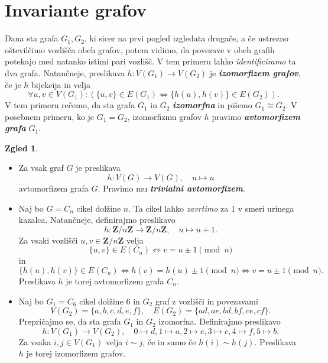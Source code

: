 \documentclass[11pt]{book}
\def\ZZ{\mathbf{Z}}
\def\definicija{\color{rdeca}\bf\em}
\theoremstyle{definition}
\theoremstyle{zgled}
\newtheorem*{zgled}{Zgled}
\theoremstyle{odprtproblem}
\theoremstyle{domacanaloga}
\theoremstyle{izrek}
\begin{document}
\section{Invariante grafov}

Dana sta grafa $G_1, G_2$, ki sicer na prvi pogled izgledata drugače, a če ustrezno oštevilčimo vozlišča obeh grafov, potem vidimo, da povezave v obeh grafih potekajo med natanko istimi pari vozlišč. V tem primeru lahko \emph{identificiramo} ta dva grafa. Natančneje, preslikava $h \colon V(G_1) \to V(G_2)$ je {\definicija izomorfizem grafov}, če je $h$ bijekcija in velja
\[
    \forall u,v \in V(G_1) \colon 
    \left( \{ u,v \} \in E(G_1) \Leftrightarrow \{ h(u), h(v) \} \in E(G_2) \right).
\]
V tem primeru rečemo, da sta grafa $G_1$ in $G_2$ {\definicija izomorfna} in pišemo $G_1 \cong G_2$. V posebnem primeru, ko je $G_1 = G_2$, izomorfizmu grafov $h$ pravimo {\definicija avtomorfizem grafa} $G_1$.

\begin{zgled} \leavevmode
    \begin{itemize}
        \item Za vsak graf $G$ je preslikava
        \[
            h \colon V(G) \to V(G), \quad 
            u \mapsto u  
        \]
        avtomorfizem grafa $G$. Pravimo mu {\definicija trivialni avtomorfizem}.

        \item Naj bo $G = C_n$ cikel dolžine $n$. Ta cikel lahko \emph{zavrtimo} za $1$ v smeri urinega kazalca. Natančneje, definirajmo preslikavo
        \[
            h \colon \ZZ/n\ZZ \to \ZZ/n\ZZ, \quad
            u \mapsto u + 1.
        \]
        Za vsaki vozlišči $u,v \in \ZZ/n\ZZ$ velja
        \[
            \{ u,v \} \in E(C_n) \Leftrightarrow v = u \pm 1 \pmod{n}
        \]
        in
        \[
            \{ h(u), h(v) \} \in E(C_n) \Leftrightarrow h(v) = h(u) \pm 1 \pmod{n}
            \Leftrightarrow v = u \pm 1 \pmod{n}.
        \]
        Preslikava $h$ je torej avtomorfizem grafa $C_n$.

        \item Naj bo $G_1 = C_6$ cikel dolžine $6$ in $G_2$ graf z vozlišči in povezavami
        \[
            V(G_2) = \{ a,b,c,d,e,f \}, \quad
            E(G_2) = \{ ad, ae, bd, bf, ce, cf \}.
        \]
        Prepričajmo se, da sta grafa $G_1$ in $G_2$ izomorfna. Definirajmo preslikavo
        \[
            h \colon V(G_1) \to V(G_2), \quad
            0 \mapsto d, 1 \mapsto a, 2 \mapsto e, 3 \mapsto c, 4 \mapsto f, 5 \mapsto b.
        \]
        Za vsaka $i,j \in V(G_1)$ velja $i \sim j$, če in samo če $h(i) \sim h(j)$. Preslikava $h$ je torej izomorfizem grafov.
    \end{itemize}
\end{zgled}
\end{document}
